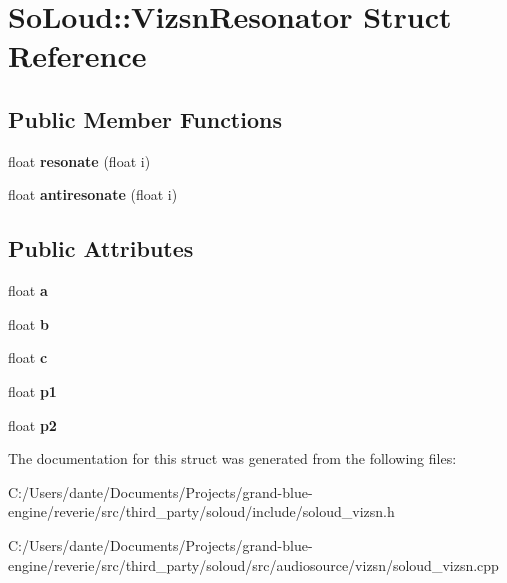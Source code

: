 \hypertarget{struct_so_loud_1_1_vizsn_resonator}{}\section{So\+Loud\+::Vizsn\+Resonator Struct Reference}
\label{struct_so_loud_1_1_vizsn_resonator}
\subsection*{Public Member Functions}
\begin{DoxyCompactItemize}
\item 
\mbox{\label{struct_so_loud_1_1_vizsn_resonator_a53c44310cb41b37afe47d583d2a278e8}} 
float {\bfseries resonate} (float i)
\item 
\mbox{\label{struct_so_loud_1_1_vizsn_resonator_a1b96cb6b3a172cf99297dc4c216563bb}} 
float {\bfseries antiresonate} (float i)
\end{DoxyCompactItemize}
\subsection*{Public Attributes}
\begin{DoxyCompactItemize}
\item 
\mbox{\label{struct_so_loud_1_1_vizsn_resonator_a2d48b58d0ffa6b126439bd0259205a7e}} 
float {\bfseries a}
\item 
\mbox{\label{struct_so_loud_1_1_vizsn_resonator_a9443a7e8a6cc49020185e84277d694ab}} 
float {\bfseries b}
\item 
\mbox{\label{struct_so_loud_1_1_vizsn_resonator_a3f3dac88f8b1f1666ddb8830527b2ce6}} 
float {\bfseries c}
\item 
\mbox{\label{struct_so_loud_1_1_vizsn_resonator_a158d3edba3d3353c1b9f5aa0d76628cc}} 
float {\bfseries p1}
\item 
\mbox{\label{struct_so_loud_1_1_vizsn_resonator_a7272f375721637b51210db4965f93048}} 
float {\bfseries p2}
\end{DoxyCompactItemize}


The documentation for this struct was generated from the following files\+:\begin{DoxyCompactItemize}
\item 
C\+:/\+Users/dante/\+Documents/\+Projects/grand-\/blue-\/engine/reverie/src/third\+\_\+party/soloud/include/soloud\+\_\+vizsn.\+h\item 
C\+:/\+Users/dante/\+Documents/\+Projects/grand-\/blue-\/engine/reverie/src/third\+\_\+party/soloud/src/audiosource/vizsn/soloud\+\_\+vizsn.\+cpp\end{DoxyCompactItemize}
